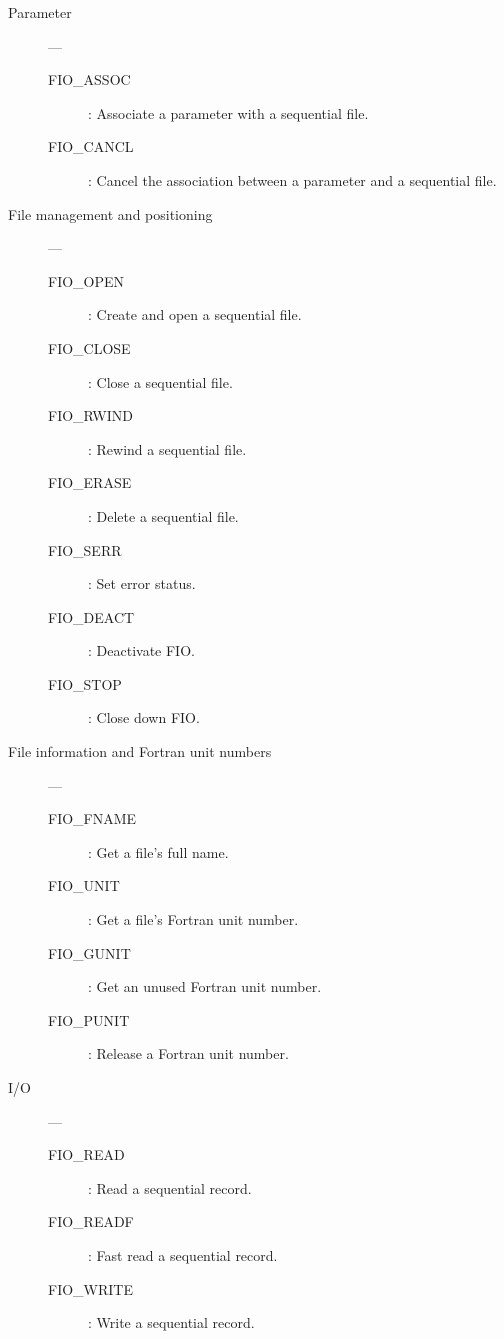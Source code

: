 \begin{description}

\item [Parameter] ---

\begin{description}
\item [FIO\_ASSOC] : Associate a parameter with a sequential file.
\item [FIO\_CANCL] : Cancel the association between a parameter and a
 sequential file.
\end{description}

\item [File management and positioning] ---

\begin{description}
\item [FIO\_OPEN] : Create and open a sequential file.
\item [FIO\_CLOSE] : Close a sequential file.
\item [FIO\_RWIND] : Rewind a sequential file.
\item [FIO\_ERASE] : Delete a sequential file.
\item [FIO\_SERR] : Set error status.
\item [FIO\_DEACT] : Deactivate FIO.
\item [FIO\_STOP] : Close down FIO.
\end{description}

\item [File information and Fortran unit numbers] ---

\begin{description}
\item [FIO\_FNAME] : Get a file's full name.
\item [FIO\_UNIT] : Get a file's Fortran unit number.
\item [FIO\_GUNIT] : Get an unused Fortran unit number.
\item [FIO\_PUNIT] : Release a Fortran unit number.
\end{description}

\item [I/O] ---

\begin{description}
\item [FIO\_READ] : Read a sequential record.
\item [FIO\_READF] : Fast read a sequential record.
\item [FIO\_WRITE] : Write a sequential record.
\end{description}

\end{description}

